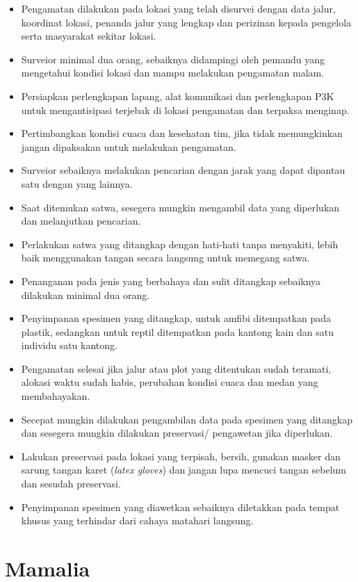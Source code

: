 \documentclass[
  oneside]{book}
\providecommand{\tightlist}{%
  \setlength{\itemsep}{0pt}\setlength{\parskip}{0pt}}
\begin{document}
\begin{itemize}
\tightlist
\item
  Pengamatan dilakukan pada lokasi yang telah disurvei dengan data jalur, koordinat lokasi, penanda jalur yang lengkap dan perizinan kepada pengelola serta masyarakat sekitar lokasi.
\item
  Surveior minimal dua orang, sebaiknya didampingi oleh pemandu yang mengetahui kondisi lokasi dan mampu melakukan pengamatan malam.
\item
  Persiapkan perlengkapan lapang, alat komunikasi dan perlengkapan P3K untuk mengantisipasi terjebak di lokasi pengamatan dan terpaksa menginap.
\item
  Pertimbangkan kondisi cuaca dan kesehatan tim, jika tidak memungkinkan jangan dipaksakan untuk melakukan pengamatan.
\item
  Surveior sebaiknya melakukan pencarian dengan jarak yang dapat dipantau satu dengan yang lainnya.
\item
  Saat ditemukan satwa, sesegera mungkin mengambil data yang diperlukan dan melanjutkan pencarian.
\item
  Perlakukan satwa yang ditangkap dengan hati-hati tanpa menyakiti, lebih baik menggunakan tangan secara langsung untuk memegang satwa.
\item
  Penanganan pada jenis yang berbahaya dan sulit ditangkap sebaiknya dilakukan minimal dua orang.
\item
  Penyimpanan spesimen yang ditangkap, untuk amfibi ditempatkan pada plastik, sedangkan untuk reptil ditempatkan pada kantong kain dan satu individu satu kantong.
\item
  Pengamatan selesai jika jalur atau plot yang ditentukan sudah teramati, alokasi waktu sudah habis, perubahan kondisi cuaca dan medan yang membahayakan.
\item
  Secepat mungkin dilakukan pengambilan data pada spesimen yang ditangkap dan sesegera mungkin dilakukan preservasi/ pengawetan jika diperlukan.
\item
  Lakukan preservasi pada lokasi yang terpisah, bersih, gunakan masker dan sarung tangan karet (\emph{latex gloves}) dan jangan lupa mencuci tangan sebelum dan sesudah preservasi.
\item
  Penyimpanan spesimen yang diawetkan sebaiknya diletakkan pada tempat khusus yang terhindar dari cahaya matahari langsung.
\end{itemize}

\hypertarget{mamalia}{%
\section*{Mamalia}\label{mamalia}}
\end{document}
